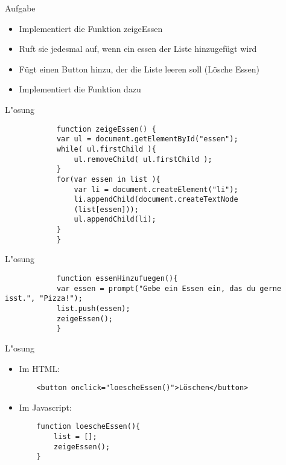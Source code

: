 \documentclass[18pt]{beamer}
\begin{document}
\begin{frame}[fragile]{Aufgabe}
\begin{itemize}
	\item Implementiert die Funktion zeigeEssen
	\item Ruft sie jedesmal auf, wenn ein essen der Liste hinzugefügt wird
	\item Fügt einen Button hinzu, der die Liste leeren soll (Lösche Essen)
	\item Implementiert die Funktion dazu
\end{itemize}
\end{frame}

\begin{frame}[fragile]{L"osung}
		\begin{lstlisting}
			function zeigeEssen() {
			var ul = document.getElementById("essen");
			while( ul.firstChild ){
				ul.removeChild( ul.firstChild );
			}
			for(var essen in list ){
				var li = document.createElement("li");
				li.appendChild(document.createTextNode
				(list[essen]));
				ul.appendChild(li);
			}
			}
		\end{lstlisting}
\end{frame}

\begin{frame}[fragile]{L"osung}
		\begin{lstlisting}
			function essenHinzufuegen(){
			var essen = prompt("Gebe ein Essen ein, das du gerne isst.", "Pizza!");
			list.push(essen);
			zeigeEssen();
			}
		\end{lstlisting}
\end{frame}

\begin{frame}[fragile]{L"osung}
\begin{itemize}
	\item Im HTML: 
	\begin{lstlisting}
	<button onclick="loescheEssen()">Löschen</button>
	\end{lstlisting}
	\item Im Javascript:
	\begin{lstlisting}
	function loescheEssen(){
		list = [];
		zeigeEssen();
	}
	\end{lstlisting}
\end{itemize}
\end{frame}
\end{document}

